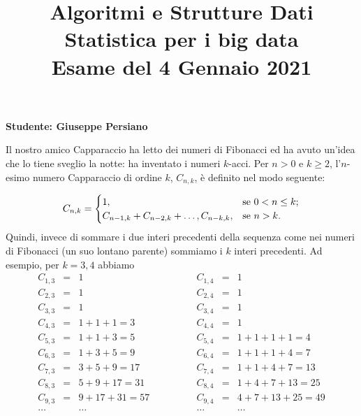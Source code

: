 \documentclass{amsart}
\begin{document}
\title{Algoritmi e Strutture Dati\\
Statistica per i big data\\
Esame del 4 Gennaio 2021
}


\newcommand{\NomeStudente}{Giuseppe Persiano}
\newcommand{\nomeClasse}{{\tt{Sol}}}
\newcommand{\nomeMetodo}{{\tt{contaDisp}}}
\newcommand{\oraconsegna}{10:35}
\newcommand{\dataoggi}{4 Gennaio, 2021}


\maketitle

\hfill{{\bf Studente: \NomeStudente}}

\smallskip
Il nostro amico Capparaccio ha letto dei numeri di Fibonacci ed ha avuto un'idea
che lo tiene sveglio la notte: ha inventato i numeri $k$-acci.
Per $n>0$ e $k\geq 2$, l'$n$-esimo numero Capparaccio di ordine $k$,
$C_{n,k}$, \`e definito nel modo seguente:

$$C_{n,k}=\begin{cases}
        1, & \text{se } 0<n\leq k;\cr
        C_{n-1,k}+C_{n-2,k}+\ldots,C_{n-k,k}, & \text{se } n>k.\cr
\end{cases}
$$
Quindi, invece di sommare i due interi precedenti della sequenza come
nei numeri di Fibonacci (un suo lontano parente) sommiamo i $k$ interi
precedenti.
Ad esempio, per $k=3,4$ abbiamo
$$
\begin{array}{rcl}
C_{1,3}&=&1\\
C_{2,3}&=&1\\
C_{3,3}&=&1\\
C_{4,3}&=&1+1+1=3\\
C_{5,3}&=&1+1+3=5\\
C_{6,3}&=&1+3+5=9\\
C_{7,3}&=&3+5+9=17\\
C_{8,3}&=&5+9+17=31\\
C_{9,3}&=&9+17+31=57\\
\ldots& &\ldots
\end{array}
\qquad
\qquad
\begin{array}{rcl}
C_{1,4}&=&1\\
C_{2,4}&=&1\\
C_{3,4}&=&1\\
C_{4,4}&=&1\\
C_{5,4}&=&1+1+1+1=4\\
C_{6,4}&=&1+1+1+4=7\\
C_{7,4}&=&1+1+4+7=13\\
C_{8,4}&=&1+4+7+13=25\\
C_{9,4}&=&4+7+13+25=49\\
\ldots& &\ldots
\end{array}
$$
\end{document}
